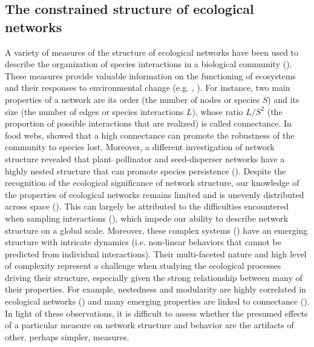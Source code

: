
\subsection{The constrained structure of ecological networks}

A variety of measures of the structure of ecological networks have been used to
describe the organization of species interactions in a biological community
(\cite{Delmas2019Analysing}). These measures provide valuable information on the
functioning of ecosystems and their responses to environmental change (e.g.
\cite{Pascual2006Ecological}, \cite{Gomez2011Functional}). For instance, two main
properties of a network are its order (the number of nodes or species $S$) and
its size (the number of edges or species interactions $L$), whose ratio $L/S^2$
(the proportion of possible interactions that are realized) is called
connectance. In food webs, \cite{Dunne2002Network} showed that a high
connectance can promote the robustness of the community to species lost.
Moreover, a different investigation of network structure revealed that
plant–pollinator and seed-disperser networks have a highly nested structure that
can promote species persistence (\cite{Bascompte2003Nested}). Despite the
recognition of the ecological significance of network structure, our knowledge
of the properties of ecological networks remains limited and is unevenly
distributed across space (\cite{Poisot2021Global}). This can largely be
attributed to the difficulties encountered when sampling interactions
(\cite{Jordano2016Sampling}), which impede our ability to describe network
structure on a global scale. Moreover, these complex systems
(\cite{Williams2000Simple}) have an emerging structure with intricate dynamics
(i.e. non-linear behaviors that cannot be predicted from individual
interactions). Their multi-faceted nature and high level of complexity represent
a challenge when studying the ecological processes driving their structure,
especially given the strong relationship between many of their properties. For
example, nestedness and modularity are highly correlated in ecological networks
(\cite{Fortuna2010Nestedness}) and many emerging properties are linked to
connectance (\cite{Poisot2014When}). In light of these observations, it is
difficult to assess whether the presumed effects of a particular measure on
network structure and behavior are the artifacts of other, perhaps simpler,
measures.

